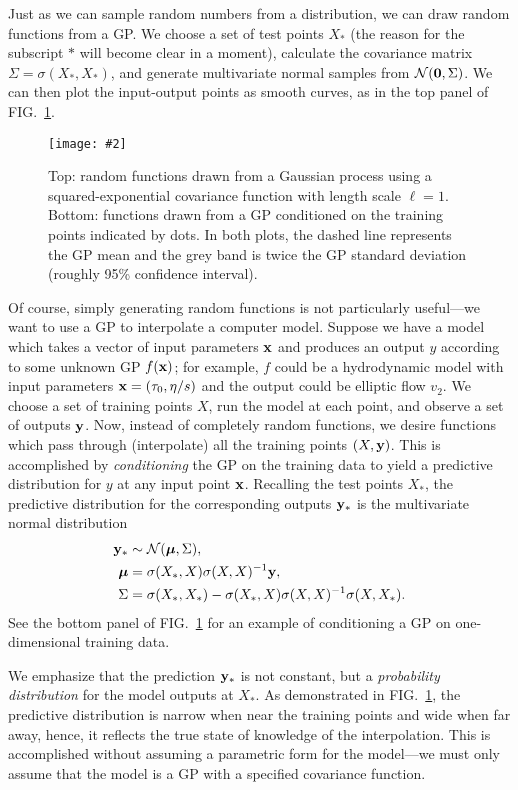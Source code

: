 \documentclass[aps,prc,reprint,superscriptaddress,amsmath]{revtex4-1}
\newcommand{\colfig}[3][t]{
  \begin{figure}[#1]
    \texttt{[image: \#2]}
    \caption{\label{fig:#2}#3}
  \end{figure}
}
\begin{document}
Just as we can sample random numbers from a distribution, we can draw random functions from a GP.
We choose a set of test points $X_*$ (the reason for the subscript $*$ will become clear in a moment), calculate the covariance matrix $\Sigma = \sigma(X_*, X_*)$, and generate multivariate normal samples from $\mathcal N(\mathbf 0, \Sigma)$.
We can then plot the input-output points as smooth curves, as in the top panel of FIG.~\ref{fig:gp}.

\colfig{gp}{
  Top: random functions drawn from a Gaussian process using a squared-exponential covariance function with length scale $\ell = 1$.
  Bottom: functions drawn from a GP conditioned on the training points indicated by dots.
  In both plots, the dashed line represents the GP mean and the grey band is twice the GP standard deviation (roughly 95\% confidence interval).
}

Of course, simply generating random functions is not particularly useful---we want to use a GP to interpolate a computer model.
Suppose we have a model which takes a vector of input parameters $\mathbf x$ and produces an output $y$ according to some unknown GP $f(\mathbf x)$; for example, $f$ could be a hydrodynamic model with input parameters $\mathbf x = (\tau_0, \eta/s)$ and the output could be elliptic flow $v_2$.
We choose a set of training points $X$, run the model at each point, and observe a set of outputs $\mathbf y$.
Now, instead of completely random functions, we desire functions which pass through (interpolate) all the training points $(X, \mathbf y)$.
This is accomplished by \emph{conditioning} the GP on the training data to yield a predictive distribution for $y$ at any input point $\mathbf x$.
Recalling the test points $X_*$, the predictive distribution for the corresponding outputs $\mathbf y_*$ is the multivariate normal distribution
\begin{equation}
  \begin{aligned}
    \mathbf y_* &\sim \mathcal N(\boldsymbol\mu, \Sigma), \\
    \boldsymbol\mu &= \sigma(X_*, X)\sigma(X, X)^{-1}\mathbf y, \\
    \Sigma &= \sigma(X_*,X_*) - \sigma(X_*,X)\sigma(X,X)^{-1}\sigma(X,X_*).
  \end{aligned}
  \label{eq:cond}
\end{equation}
See the bottom panel of FIG.~\ref{fig:gp} for an example of conditioning a GP on one-dimensional training data.

We emphasize that the prediction $\mathbf y_*$ is not constant, but a \emph{probability distribution} for the model outputs at $X_*$.
As demonstrated in FIG.~\ref{fig:gp}, the predictive distribution is narrow when near the training points and wide when far away, hence, it reflects the true state of knowledge of the interpolation.
This is accomplished without assuming a parametric form for the model---we must only assume that the model is a GP with a specified covariance function.
\end{document}
